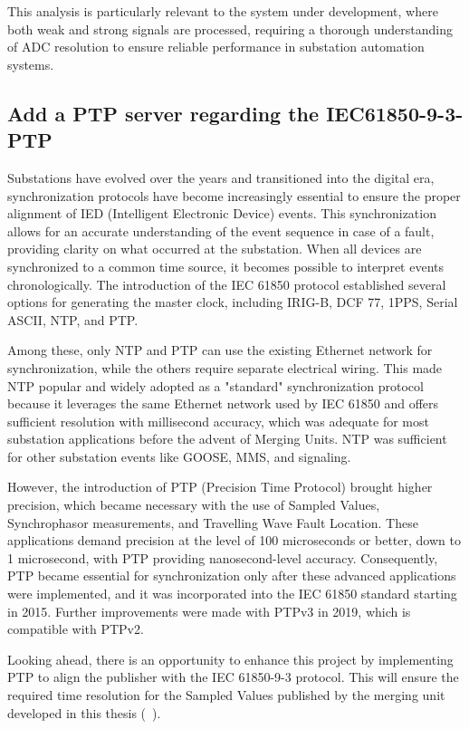 This analysis is particularly relevant to the system under development, where both weak and strong signals are processed, requiring a thorough understanding of ADC resolution to ensure reliable performance in substation automation systems.

\subsection{Add a PTP server regarding the IEC61850-9-3-PTP}

Substations have evolved over the years and transitioned into the digital era, synchronization protocols have become increasingly essential to ensure the proper alignment of IED (Intelligent Electronic Device) events. This synchronization allows for an accurate understanding of the event sequence in case of a fault, providing clarity on what occurred at the substation. When all devices are synchronized to a common time source, it becomes possible to interpret events chronologically. The introduction of the IEC 61850 protocol established several options for generating the master clock, including IRIG-B, DCF 77, 1PPS, Serial ASCII, NTP, and PTP.

Among these, only NTP and PTP can use the existing Ethernet network for synchronization, while the others require separate electrical wiring. This made NTP popular and widely adopted as a "standard" synchronization protocol because it leverages the same Ethernet network used by IEC 61850 and offers sufficient resolution with millisecond accuracy, which was adequate for most substation applications before the advent of Merging Units. NTP was sufficient for other substation events like GOOSE, MMS, and signaling.

However, the introduction of PTP (Precision Time Protocol) brought higher precision, which became necessary with the use of Sampled Values, Synchrophasor measurements, and Travelling Wave Fault Location. These applications demand precision at the level of 100 microseconds or better, down to 1 microsecond, with PTP providing nanosecond-level accuracy. Consequently, PTP became essential for synchronization only after these advanced applications were implemented, and it was incorporated into the IEC 61850 standard starting in 2015. Further improvements were made with PTPv3 in 2019, which is compatible with PTPv2.

Looking ahead, there is an opportunity to enhance this project by implementing PTP to align the publisher with the IEC 61850-9-3 protocol. This will ensure the required time resolution for the Sampled Values published by the merging unit developed in this thesis (~\cite{baumgartner2024iec}).
			
